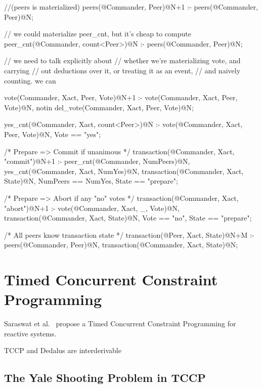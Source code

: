 \begin{Dedalus}
\small
//(peers is materialized)
peers(@Commander, Peer)@N+1 :-
    peers(@Commander, Peer)@N;

// we could materialize peer_cnt, but it's 
cheap to compute
peer_cnt(@Commander, count<Peer>)@N :-
  peers(@Commander, Peer)@N;

// we need to talk explicitly about 
// whether we're materializing vote, and carrying 
// out deductions over it, or treating it as an event, 
// and naively counting.  we can 

vote(Commander, Xact, Peer, Vote)@N+1 :-
    vote(Commander, Xact, Peer, Vote)@N,
    notin del_vote(Commander, Xact, Peer, Vote)@N;

yes_cnt(@Commander, Xact, count<Peer>)@N :-
  vote(@Commander, Xact, Peer, Vote)@N,
  Vote == "yes";

/* Prepare => Commit if unanimous */
transaction(@Commander, Xact, "commit")@N+1 :-
  peer_cnt(@Commander, NumPeers)@N,
  yes_cnt(@Commander, Xact, NumYes)@N,
  transaction(@Commander, Xact, State)@N,
  NumPeers == NumYes, State == "prepare";

/* Prepare => Abort if any "no" votes */
transaction(@Commander, Xact, "abort")@N+1 :-
  vote(@Commander, Xact, _, Vote)@N,
  transaction(@Commander, Xact, State)@N,
  Vote == "no", State == "prepare";

/* All peers know transaction state */
transaction(@Peer, Xact, State)@N+M :-
  peers(@Commander, Peer)@N,
  transaction(@Commander, Xact, State)@N;
\end{Dedalus}

\section{Timed Concurrent Constraint Programming}

 
Saraswat et al.~\cite{tccp, tdccp} propose a Timed Concurrent Constraint Programming for reactive systems.


\begin{conjecture}
TCCP and Dedalus are interderivable
\end{conjecture}

\subsection{The Yale Shooting Problem in TCCP}

